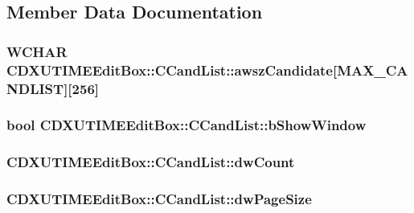 \subsection{Member Data Documentation}
\hypertarget{struct_c_d_x_u_t_i_m_e_edit_box_1_1_c_cand_list_aef82c852a847a33235232f27e012cbf1}{
\subsubsection[{awszCandidate}]{\setlength{\rightskip}{0pt plus 5cm}WCHAR {\bf CDXUTIMEEditBox::CCandList::awszCandidate}\mbox{[}MAX\_\-CANDLIST\mbox{]}\mbox{[}256\mbox{]}}}
\label{struct_c_d_x_u_t_i_m_e_edit_box_1_1_c_cand_list_aef82c852a847a33235232f27e012cbf1}
\hypertarget{struct_c_d_x_u_t_i_m_e_edit_box_1_1_c_cand_list_a6bc94b56fbc55dd65256ab6b310d8b7e}{
\subsubsection[{bShowWindow}]{\setlength{\rightskip}{0pt plus 5cm}bool {\bf CDXUTIMEEditBox::CCandList::bShowWindow}}}
\label{struct_c_d_x_u_t_i_m_e_edit_box_1_1_c_cand_list_a6bc94b56fbc55dd65256ab6b310d8b7e}
\hypertarget{struct_c_d_x_u_t_i_m_e_edit_box_1_1_c_cand_list_a74bcc9376411c8c858ff1f7b04fff215}{
\subsubsection[{dwCount}]{ {\bf CDXUTIMEEditBox::CCandList::dwCount}}}
\label{struct_c_d_x_u_t_i_m_e_edit_box_1_1_c_cand_list_a74bcc9376411c8c858ff1f7b04fff215}
\hypertarget{struct_c_d_x_u_t_i_m_e_edit_box_1_1_c_cand_list_aac258950f85f59272514ca97f2873a2c}{
\subsubsection[{dwPageSize}]{ {\bf CDXUTIMEEditBox::CCandList::dwPageSize}}}
